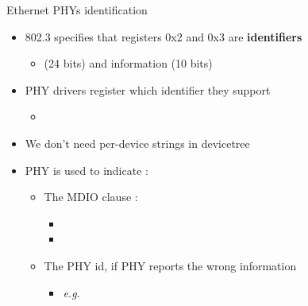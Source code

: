 \begin{frame}[fragile]{Ethernet PHYs identification}
	\begin{itemize}
		\item 802.3 specifies that registers 0x2 and 0x3 are \textbf{identifiers}
			\begin{itemize}
				\item {} (24 bits) and  information (10 bits)
			\end{itemize}
		\item PHY drivers register which identifier they support
			\begin{itemize}
				\item {}
			\end{itemize}
		\item We don't need per-device  strings in devicetree
		\item PHY  is used to indicate :
			\begin{itemize}
				\item The MDIO clause :
					\begin{itemize}
						\item {}
						\item {}
					\end{itemize}
				\item The PHY id, if PHY reports the wrong information
					\begin{itemize}
						\item \textit{e.g.} 
					\end{itemize}
			\end{itemize}
	\end{itemize}
\end{frame}

